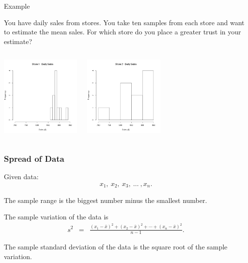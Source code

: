 \begin{frame}{Example}

  You have daily sales from stores. You take ten samples from each store and
  want to estimate the mean sales. For which store do you place a
  greater trust in your estimate?

  \begin{columns}
    \includegraphics[width=4cm]{img/dailySalesStore1}

    \includegraphics[width=4cm]{img/dailySalesStore2}
    
  \end{columns}
  
\end{frame}

\begin{frame}
  \frametitle{Spread of Data}

  Given data:
  \begin{eqnarray*}
    x_1, ~ x_2, ~ x_3, ~ \ldots ~,x_n.
  \end{eqnarray*}

  \begin{definition}
    The sample range is the biggest number minus the smallest number.
  \end{definition}


  \begin{definition}
    The sample variation of the data is 
    \begin{eqnarray*}
      s^2 & = & \frac{(x_1-\bar{x})^2+(x_2-\bar{x})^2+\cdots+(x_n-\bar{x})^2}{n-1}.
    \end{eqnarray*}
  \end{definition}

  \begin{definition}
    The sample standard deviation of the data is the square root of
    the sample variation.
  \end{definition}


\end{frame}

